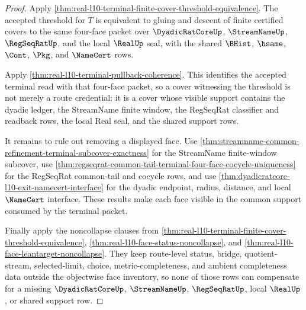 \begin{proof}
Apply
\autoref{thm:real-l10-terminal-finite-cover-threshold-equivalence}. The
accepted threshold for $T$ is equivalent to gluing and descent of finite
certified covers to the same four-face packet over $\DyadicRatCoreUp$,
$\StreamNameUp$, $\RegSeqRatUp$, and the local $\RealUp$ seal, with the shared
$\BHist$, $\hsame$, $\Cont$, $\Pkg$, and $\NameCert$ rows.

Apply \autoref{thm:real-l10-terminal-pullback-coherence}. This identifies the
accepted terminal read with that four-face packet, so a cover witnessing the
threshold is not merely a route credential: it is a cover whose visible support
contains the dyadic ledger, the StreamName finite window, the RegSeqRat
classifier and readback rows, the local Real seal, and the shared support rows.

It remains to rule out removing a displayed face. Use
\autoref{thm:streamname-common-refinement-terminal-subcover-exactness} for the
StreamName finite-window subcover, use
\autoref{thm:regseqrat-common-tail-terminal-four-face-cocycle-uniqueness} for
the RegSeqRat common-tail and cocycle rows, and use
\autoref{thm:dyadicratcore-l10-exit-namecert-interface} for the dyadic endpoint,
radius, distance, and local $\NameCert$ interface. These results make each
face visible in the common support consumed by the terminal packet.

Finally apply the noncollapse clauses from
\autoref{thm:real-l10-terminal-finite-cover-threshold-equivalence},
\autoref{thm:real-l10-face-status-noncollapse}, and
\autoref{thm:real-l10-face-leantarget-noncollapse}. They keep route-level
status, bridge, quotient-stream, selected-limit, choice,
metric-completeness, and ambient completeness data outside the objectwise face
inventory, so none of those rows can compensate for a missing
$\DyadicRatCoreUp$, $\StreamNameUp$, $\RegSeqRatUp$, local $\RealUp$, or shared
support row.
\end{proof}

